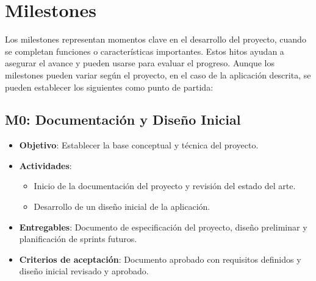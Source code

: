 \begin{itemize}
\end{itemize}

\section{Milestones}    
Los milestones representan momentos clave en el desarrollo del proyecto, cuando se completan funciones o características importantes. Estos hitos ayudan a asegurar el avance y pueden usarse para evaluar el progreso. Aunque los milestones pueden variar según el proyecto, en el caso de la aplicación descrita, se pueden establecer los siguientes como punto de partida:

\subsection{M0: Documentación y Diseño Inicial}
\begin{itemize}
    \item \textbf{Objetivo}: Establecer la base conceptual y técnica del proyecto.
    \item \textbf{Actividades}:
        \begin{itemize}
            \item Inicio de la documentación del proyecto y revisión del estado del arte.
            \item Desarrollo de un diseño inicial de la aplicación.
        \end{itemize}
    \item \textbf{Entregables}: Documento de especificación del proyecto, diseño preliminar y planificación de sprints futuros.
    \item \textbf{Criterios de aceptación}: Documento aprobado con requisitos definidos y diseño inicial revisado y aprobado.
\end{itemize}

